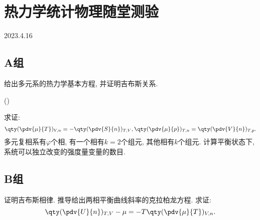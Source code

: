 \section{热力学统计物理随堂测验}
2023.4.16
\subsection{A组}
\begin{questions}
  \question 给出多元系的热力学基本方程, 并证明吉布斯关系.
  \begin{solution}
    ()
  \end{solution}
  \question 求证:
  \begin{equation}
    \qty(\pdv{\mu}{T})_{V,n} = - \qty(\pdv{S}{n})_{T,V}, \qty(\pdv{\mu}{p})_{T,n} = \qty(\pdv{V}{n})_{T,p}.
  \end{equation}
  \question 多元复相系有$\varphi$个相, 有一个相有$k=2$个组元, 其他相有$k$个组元. 计算平衡状态下, 系统可以独立改变的强度量变量的数目.
\end{questions}
\subsection{B组}
\begin{questions}
  \question 证明吉布斯相律.
  \question 推导给出两相平衡曲线斜率的克拉柏龙方程.
  \question 求证:
  \begin{equation}
    \qty(\pdv{U}{n})_{T,V} - \mu = -T\qty(\pdv{\mu}{T})_{V,n}.
  \end{equation}
\end{questions}
